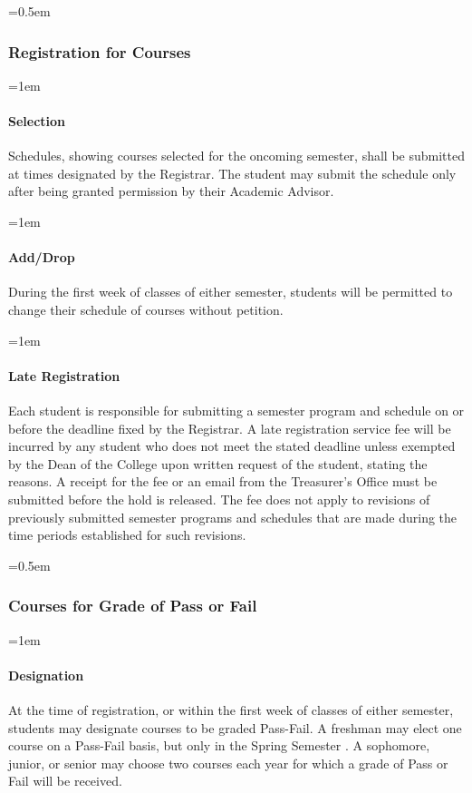 \documentclass{manual}
\newcommand{\oldbreak}[1]{}
\let\oldsubsubsection\subsubsection
\renewcommand\subsubsection{\leftskip=0.5em\oldsubsubsection}
\let\oldparagraph\paragraph
\renewcommand\paragraph{\leftskip=1em\oldparagraph}
\begin{document}
\oldbreak{V-3}

\subsubsection{Registration for Courses}

\paragraph{Selection}
Schedules, showing courses selected for the oncoming semester, shall be submitted at times designated by the Registrar. The student may submit the schedule only after being granted permission by their Academic Advisor.

\paragraph{Add/Drop}
During the first week of classes of either semester, students will be permitted to change their schedule of courses without petition.

\paragraph{Late Registration}
Each student is responsible for submitting a semester program and schedule on or before the deadline fixed by the Registrar. A late registration service fee will be incurred by any student who does not meet the stated deadline unless  exempted by the Dean of the College upon written request of the student, stating the reasons. A receipt for the fee or an email from the Treasurer's Office must be submitted before the hold is released. The fee does not apply to revisions of previously submitted semester programs and schedules that are made during the time periods established for such revisions.

\subsubsection{Courses for Grade of \textbf{Pass} or Fail}\label{sub:CoursesForGradeOfPassOrFail}

\paragraph{Designation}
At the time of registration, or within the first week of classes of either semester, students may designate courses to be graded Pass-Fail. A freshman may elect one course on a Pass-Fail basis, but only in the Spring Semester . A sophomore, junior, or senior may choose two courses each year for which  a grade of Pass or Fail will be received. 
\end{document}
